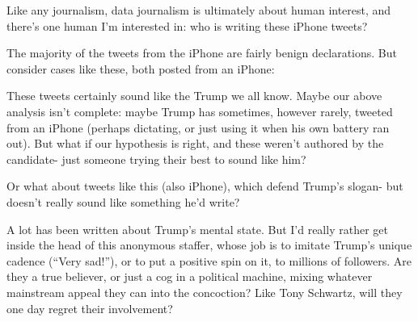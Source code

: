 \documentclass[
]{jss}
\begin{document}
Like any journalism, data journalism is ultimately about human interest,
and there's one human I'm interested in: who is writing these iPhone
tweets?

The majority of the tweets from the iPhone are fairly benign
declarations. But consider cases like these, both posted from an iPhone:

These tweets certainly sound like the Trump we all know. Maybe our above
analysis isn't complete: maybe Trump has sometimes, however rarely,
tweeted from an iPhone (perhaps dictating, or just using it when his own
battery ran out). But what if our hypothesis is right, and these weren't
authored by the candidate- just someone trying their best to sound like
him?

Or what about tweets like this (also iPhone), which defend Trump's
slogan- but doesn't really sound like something he'd write?

A lot has been written about Trump's mental state. But I'd really rather
get inside the head of this anonymous staffer, whose job is to imitate
Trump's unique cadence (``Very sad!''), or to put a positive spin on it,
to millions of followers. Are they a true believer, or just a cog in a
political machine, mixing whatever mainstream appeal they can into the
\citet{realDonaldTrump} concoction? Like Tony Schwartz, will they one
day regret their involvement?
\end{document}
